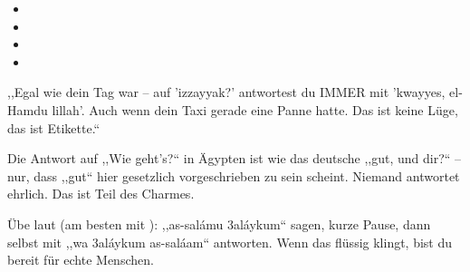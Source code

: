 \begin{itemize}[leftmargin=*]
\item {}
\item {}
\item {}
\item {}
\end{itemize}

\begin{ammahmoudbox}
,,Egal wie dein Tag war -- auf 'izzayyak?' antwortest du IMMER mit
'kwayyes, el-Hamdu lillah'. Auch wenn dein Taxi gerade eine Panne hatte.
Das ist keine Lüge, das ist Etikette.``
\end{ammahmoudbox}

\begin{lachbox}
Die Antwort auf ,,Wie geht's?`` in Ägypten ist wie das deutsche
,,gut, und dir?`` -- nur, dass ,,gut`` hier gesetzlich vorgeschrieben zu
sein scheint. Niemand antwortet ehrlich. Das ist Teil des Charmes.
\end{lachbox}

\begin{checkpointbox}
Übe laut (am besten mit \textcolor{yallateal}{\faVolumeUp}): ,,as-sal\'amu
3al\'aykum`` sagen, kurze Pause, dann selbst mit ,,wa 3al\'aykum
as-sal\'aam`` antworten. Wenn das flüssig klingt, bist du bereit für echte
Menschen.
\end{checkpointbox}
